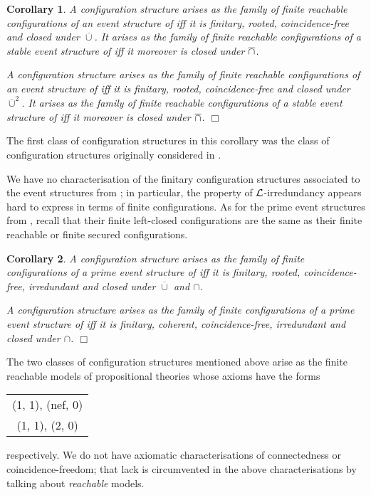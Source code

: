 \documentclass[twocolumn]{article}
\newtheorem{coro}{Corollary}
\newenvironment{corollary}[1]{\begin{coro} \rm \label{cor-#1} }{\end{coro}}
\begin{document}
\begin{corollary}{characterisation-Winskel finitary reachable}
A configuration structure arises as the family of finite reachable
configurations of an event structure of \cite{Wi87a} iff it is
finitary, rooted, coincidence-free and closed under $\overline\cup$.  It
arises as the family of finite reachable configurations of a stable
event structure of \cite{Wi87a} iff it moreover is closed under
$\overline{\cap}$.

A configuration structure arises as the family of finite reachable
configurations of an event structure of \cite{Wi89} iff it is
finitary, rooted, coincidence-free and closed under $\overline\cup^2$.
It arises as the family of finite reachable configurations of a
stable event structure of \cite{Wi89} iff it moreover is closed under
$\overline{\cap}$.
\hfill $\Box$
\end{corollary}
The first class of configuration structures in this corollary was the
class of configuration structures originally considered in \cite{GG90}.

We have no characterisation of the finitary configuration structures
associated to the event structures from \cite{NPW81}; in particular,
the property of ${\cal L}$-irredundancy appears hard to express in terms of
finite configurations. As for the prime event structures from
\cite{Wi87a,Wi89}, recall that their finite left-closed configurations
are the same as their finite reachable or finite secured configurations.

\begin{corollary}{characterisation-prime-Winskel finitary}
A configuration structure arises as the family of finite
configurations of a prime event structure of \cite{Wi87a} iff it is
finitary, rooted, coincidence-free, irredundant and closed under
$\overline\cup$ and $\cap$.

A configuration structure arises as the family of finite
configurations of a prime event structure of \cite{Wi89} iff it is
finitary, coherent, coincidence-free, irredundant and closed under
$\cap$.
\hfill $\Box$
\end{corollary}
The two classes of configuration structures mentioned above
arise as the finite reachable models of propositional
theories whose axioms have the forms
\begin{center}
\begin{tabular}{c}
(1, 1), (nef, 0)\\
(1, 1), (2, 0)
\end{tabular}
\end{center}
respectively. We do not have axiomatic characterisations of
connectedness or coincidence-freedom; that lack is circumvented in the
above characterisations by talking about \emph{reachable} models.
\end{document}
